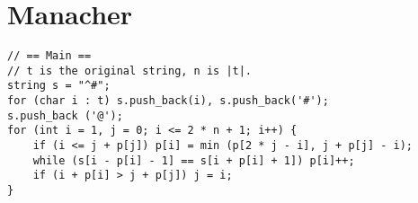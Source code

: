 \section{Manacher}

\begin{verbatim}
// == Main ==
// t is the original string, n is |t|.
string s = "^#";
for (char i : t) s.push_back(i), s.push_back('#');
s.push_back ('@');
for (int i = 1, j = 0; i <= 2 * n + 1; i++) {
    if (i <= j + p[j]) p[i] = min (p[2 * j - i], j + p[j] - i);
    while (s[i - p[i] - 1] == s[i + p[i] + 1]) p[i]++;
    if (i + p[i] > j + p[j]) j = i;
}
\end{verbatim}